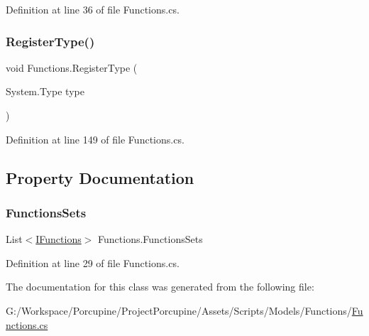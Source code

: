 Definition at line 36 of file Functions.\+cs.

\mbox{\label{class_functions_a80433db8540228fe69d49c3dfcb94660}} 
\subsubsection{\texorpdfstring{Register\+Type()}{RegisterType()}}
{\footnotesize\ttfamily void Functions.\+Register\+Type (\begin{DoxyParamCaption}\item[{System.\+Type}]{type }\end{DoxyParamCaption})}



Definition at line 149 of file Functions.\+cs.



\subsection{Property Documentation}
\mbox{\label{class_functions_a254acb0bde27c6fc1bb10a1292309180}} 
\subsubsection{\texorpdfstring{Functions\+Sets}{FunctionsSets}}
{\footnotesize\ttfamily List$<$\hyperlink{interface_i_functions}{I\+Functions}$>$ Functions.\+Functions\+Sets\hspace{0.3cm}{\ttfamily [get]}}



Definition at line 29 of file Functions.\+cs.



The documentation for this class was generated from the following file\+:\begin{DoxyCompactItemize}
\item 
G\+:/\+Workspace/\+Porcupine/\+Project\+Porcupine/\+Assets/\+Scripts/\+Models/\+Functions/\hyperlink{_functions_8cs}{Functions.\+cs}\end{DoxyCompactItemize}
